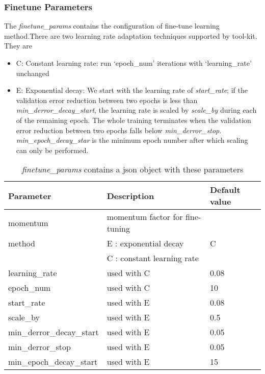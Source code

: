 \subsubsection{Finetune Parameters}
\label{subsec:finetuneparam}
The \emph{finetune\_params} contains the configuration of fine-tune learning method.There are two learning rate adaptation techniques supported by tool-kit.  They are
\begin{itemize}
\item C: Constant learning rate: run `epoch\_num' iterations with `learning\_rate' unchanged
\item E: Exponential decay: We start with the learning rate of \emph{start\_rate}; if the validation error reduction between two epochs is less than \emph{min\_derror\_decay\_start}, the learning rate is scaled by \emph{scale\_by} during each of the remaining epoch.  The whole training terminates when the validation error reduction between two epochs falls below \emph{min\_derror\_stop}. \emph{min\_epoch\_decay\_star} is the minimum epoch number after which scaling can only be performed.
\end{itemize}
\begin{table}[h]
\centering
\caption[]{\textit{finetune\_params} contains a json object with these parameters}
\begin{tabular}{|l|l|l|}
\hline
\textbf{Parameter}	& \textbf{Description} 				& \textbf{Default value}\\  \hline
momentum 			& momentum factor for fine-tuning 	& \\
method 				& E : exponential decay 			& C\\
					& C : constant learning rate 		& \\
learning\_rate   	& used with C 						& 0.08\\
epoch\_num          & used with C 			 			& 10\\
start\_rate         & used with E 						& 0.08 \\
scale\_by           & used with E 						& 0.5\\
min\_derror\_decay\_start& used with E 					& 0.05\\
min\_derror\_stop   & used with E 						& 0.05 \\
min\_epoch\_decay\_start  & used with E 					& 15\\
\hline
\end{tabular}
\end{table}

\clearpage

